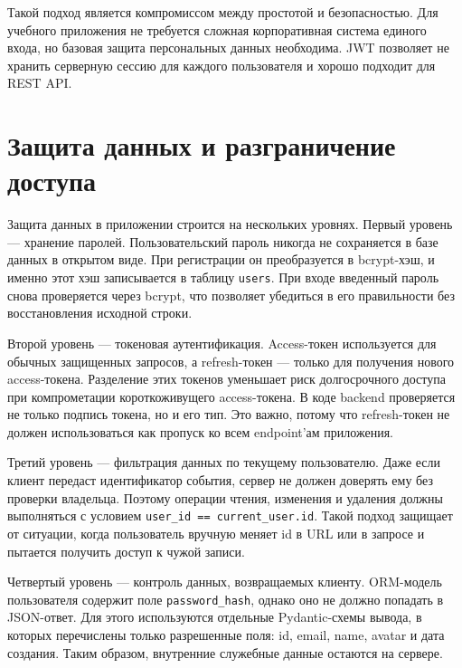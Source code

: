 \documentclass[14pt,a4paper]{extreport}
\begin{document}
Такой подход является компромиссом между простотой и безопасностью. Для учебного приложения не требуется сложная корпоративная система единого входа, но базовая защита персональных данных необходима. JWT позволяет не хранить серверную сессию для каждого пользователя и хорошо подходит для REST API.

\section{Защита данных и разграничение доступа}

Защита данных в приложении строится на нескольких уровнях. Первый уровень --- хранение паролей. Пользовательский пароль никогда не сохраняется в базе данных в открытом виде. При регистрации он преобразуется в bcrypt-хэш, и именно этот хэш записывается в таблицу \texttt{users}. При входе введенный пароль снова проверяется через bcrypt, что позволяет убедиться в его правильности без восстановления исходной строки.

Второй уровень --- токеновая аутентификация. Access-токен используется для обычных защищенных запросов, а refresh-токен --- только для получения нового access-токена. Разделение этих токенов уменьшает риск долгосрочного доступа при компрометации короткоживущего access-токена. В коде backend проверяется не только подпись токена, но и его тип. Это важно, потому что refresh-токен не должен использоваться как пропуск ко всем endpoint'ам приложения.

Третий уровень --- фильтрация данных по текущему пользователю. Даже если клиент передаст идентификатор события, сервер не должен доверять ему без проверки владельца. Поэтому операции чтения, изменения и удаления должны выполняться с условием \texttt{user\_id == current\_user.id}. Такой подход защищает от ситуации, когда пользователь вручную меняет id в URL или в запросе и пытается получить доступ к чужой записи.

Четвертый уровень --- контроль данных, возвращаемых клиенту. ORM-модель пользователя содержит поле \texttt{password\_hash}, однако оно не должно попадать в JSON-ответ. Для этого используются отдельные Pydantic-схемы вывода, в которых перечислены только разрешенные поля: id, email, name, avatar и дата создания. Таким образом, внутренние служебные данные остаются на сервере.
\end{document}
